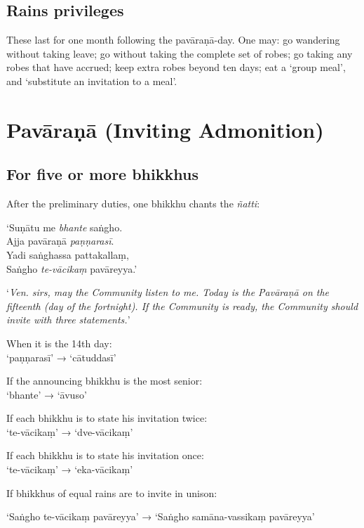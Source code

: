 
\subsection{Rains privileges}

These last for one month following the pavāraṇā-day. One may: go wandering
without taking leave; go without taking the complete set of robes; go taking any
robes that have accrued; keep extra robes beyond ten days; eat a ‘group meal’,
and ‘substitute an invitation to a meal’.

\section{Pavāraṇā (Inviting Admonition)}

\subsection{For five or more bhikkhus}

After the preliminary duties, one bhikkhu chants the \emph{ñatti}:

‘Suṇātu me \emph{bhante} saṅgho.\\
Ajja pavāraṇā \emph{paṇṇarasī}.\\
Yadi saṅghassa pattakallaṃ,\\
Saṅgho \emph{te-vācikaṃ} pavāreyya.’

‘\emph{Ven. sirs, may the Community listen to me. Today is the Pavāraṇā on the
  fifteenth (day of the fortnight). If the Community is ready, the Community
  should invite with three statements.}’


When it is the 14th day:\\
‘paṇṇarasī’ → ‘cātuddasī’

If the announcing bhikkhu is the most senior:\\
‘bhante’ → ‘āvuso’

If each bhikkhu is to state his invitation twice:\\
‘te-vācikaṃ’ → ‘dve-vācikaṃ’

If each bhikkhu is to state his invitation once:\\
‘te-vācikaṃ’ → ‘eka-vācikaṃ’

If bhikkhus of equal rains are to invite in unison:

‘Saṅgho te-vācikaṃ pavāreyya’ → ‘Saṅgho samāna-vassikaṃ pavāreyya’

